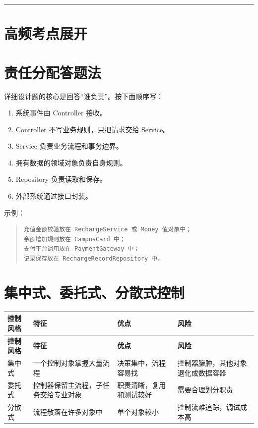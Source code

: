 \documentclass[UTF8,zihao=-4]{ctexart}
\begin{document}
\bigskip\hrule\bigskip

\section{高频考点展开}

\section{责任分配答题法}

详细设计题的核心是回答“谁负责”。按下面顺序写：

\begin{enumerate}
\item 系统事件由 Controller 接收。
\item Controller 不写业务规则，只把请求交给 Service。
\item Service 负责业务流程和事务边界。
\item 拥有数据的领域对象负责自身规则。
\item Repository 负责读取和保存。
\item 外部系统通过接口封装。
\end{enumerate}

示例：

\begin{quote}
\footnotesize
\begin{verbatim}
充值金额校验放在 RechargeService 或 Money 值对象中；
余额增加规则放在 CampusCard 中；
支付平台调用放在 PaymentGateway 中；
记录保存放在 RechargeRecordRepository 中。
\end{verbatim}
\end{quote}

\section{集中式、委托式、分散式控制}

{
\footnotesize
\begin{longtable}{|>{\raggedright\arraybackslash}p{}|>{\raggedright\arraybackslash}p{}|>{\raggedright\arraybackslash}p{}|>{\raggedright\arraybackslash}p{}|}
\hline
\textbf{控制风格} & \textbf{特征} & \textbf{优点} & \textbf{风险} \\
\hline
\endfirsthead
\hline
\textbf{控制风格} & \textbf{特征} & \textbf{优点} & \textbf{风险} \\
\hline
\endhead
集中式 & 一个控制对象掌握大量流程 & 决策集中，流程容易找 & 控制器臃肿，其他对象退化成数据容器 \\
\hline
委托式 & 控制器保留主流程，子任务交给专业对象 & 职责清晰，复用和测试较好 & 需要合理划分职责 \\
\hline
分散式 & 流程散落在许多对象中 & 单个对象较小 & 控制流难追踪，调试成本高 \\
\hline
\end{longtable}
}
\end{document}
